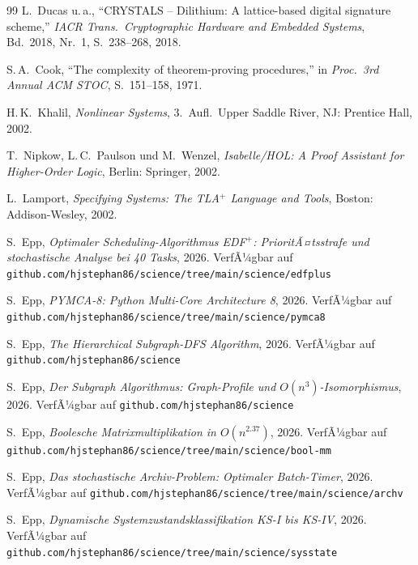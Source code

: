 ﻿\documentclass[a4paper,12pt]{scrreprt}
\theoremstyle{definition}
\begin{document}
\begin{thebibliography}{99}
		L.\ Ducas u.\,a.,
		``CRYSTALS -- Dilithium: A lattice-based digital signature scheme,''
		\textit{IACR Trans.\ Cryptographic Hardware and Embedded Systems},
		Bd.~2018, Nr.~1, S.~238--268, 2018.
		
		S.\,A.\ Cook,
		``The complexity of theorem-proving procedures,''
		in \textit{Proc.\ 3rd Annual ACM STOC}, S.~151--158, 1971.
		
		H.\,K.\ Khalil,
		\textit{Nonlinear Systems}, 3.~Aufl.\ Upper Saddle River, NJ:
		Prentice Hall, 2002.
		
		T.\ Nipkow, L.\,C.\ Paulson und M.\ Wenzel,
		\textit{Isabelle/HOL: A Proof Assistant for Higher-Order Logic},
		Berlin: Springer, 2002.
		
		L.\ Lamport,
		\textit{Specifying Systems: The TLA$^+$ Language and Tools},
		Boston: Addison-Wesley, 2002.
		
		S.\ Epp,
		\textit{Optimaler Scheduling-Algorithmus EDF$^+$: PrioritÃ¤tsstrafe und
		stochastische Analyse bei 40 Tasks}, 2026. VerfÃ¼gbar auf
		\texttt{github.com/hjstephan86/science/tree/main/science/edfplus}
		
		S.\ Epp,
		\textit{PYMCA-8: Python Multi-Core Architecture 8}, 2026. VerfÃ¼gbar auf
		\texttt{github.com/hjstephan86/science/tree/main/science/pymca8}
		
		S.\ Epp,
		\textit{The Hierarchical Subgraph-DFS Algorithm}, 2026. VerfÃ¼gbar auf
		\texttt{github.com/hjstephan86/science}
		
		S.\ Epp,
		\textit{Der Subgraph Algorithmus: Graph-Profile und $O(n^3)$-Isomorphismus}, 2026. VerfÃ¼gbar auf \texttt{github.com/hjstephan86/science}
		
		S.\ Epp,
		\textit{Boolesche Matrixmultiplikation in $O(n^{2.37})$}, 2026. VerfÃ¼gbar auf \texttt{github.com/hjstephan86/science/tree/main/science/bool-mm}
		
		S.\ Epp,
		\textit{Das stochastische Archiv-Problem: Optimaler Batch-Timer}, 2026. VerfÃ¼gbar auf
		\texttt{github.com/hjstephan86/science/tree/main/science/archv}
		
		S.\ Epp,
		\textit{Dynamische Systemzustandsklassifikation KS-I bis KS-IV}, 2026. VerfÃ¼gbar auf
		\texttt{github.com/hjstephan86/science/tree/main/science/sysstate}
		

\end{thebibliography}
\end{document}
